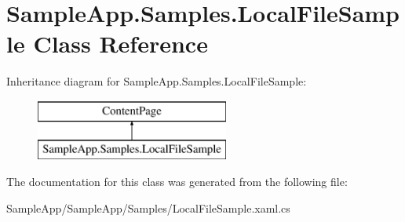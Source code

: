 \hypertarget{class_sample_app_1_1_samples_1_1_local_file_sample}{}\section{Sample\+App.\+Samples.\+Local\+File\+Sample Class Reference}
\label{class_sample_app_1_1_samples_1_1_local_file_sample}
Inheritance diagram for Sample\+App.\+Samples.\+Local\+File\+Sample\+:\begin{figure}[H]
\begin{center}
\leavevmode
\includegraphics[height=2.000000cm]{class_sample_app_1_1_samples_1_1_local_file_sample}
\end{center}
\end{figure}


The documentation for this class was generated from the following file\+:\begin{DoxyCompactItemize}
\item 
Sample\+App/\+Sample\+App/\+Samples/Local\+File\+Sample.\+xaml.\+cs\end{DoxyCompactItemize}
